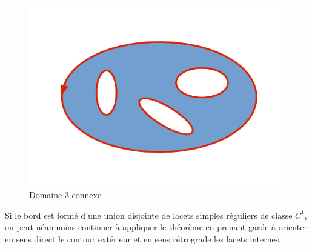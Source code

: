 \begin{figure}[ht]
\includegraphics[scale=0.3]{images/domaine_trois_connexe.pdf}
\caption{Domaine 3-connexe}\label{fig:domaine_trois_connexe}
\end{figure}
Si le bord est formé d'une union disjointe de lacets simples réguliers de classe $C^1$, on peut néanmoins continuer à appliquer le théorème en prenant garde à orienter en sens direct le contour extérieur et en sens rétrograde les lacets internes. 

